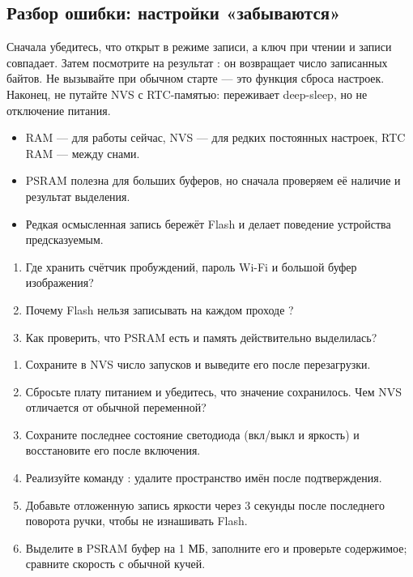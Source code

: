\subsection{Разбор ошибки: настройки «забываются»}

Сначала убедитесь, что  открыт в режиме записи, а ключ при чтении и
записи совпадает. Затем посмотрите на результат : он возвращает число записанных байтов.
Не вызывайте  при обычном старте --- это функция сброса настроек. Наконец, не путайте
NVS с RTC-памятью:  переживает deep-sleep, но не отключение питания.

\begin{summary}
\begin{itemize}[leftmargin=*]
  \item RAM --- для работы сейчас, NVS --- для редких постоянных настроек, RTC RAM --- между снами.
  \item PSRAM полезна для больших буферов, но сначала проверяем её наличие и результат выделения.
  \item Редкая осмысленная запись бережёт Flash и делает поведение устройства предсказуемым.
\end{itemize}
\end{summary}

\begin{selfcheck}
\begin{enumerate}
  \item Где хранить счётчик пробуждений, пароль Wi-Fi и большой буфер изображения?
  \item Почему Flash нельзя записывать на каждом проходе ?
  \item Как проверить, что PSRAM есть и память действительно выделилась?
\end{enumerate}
\end{selfcheck}

\begin{tasks}
\begin{enumerate}
\item {} Сохраните в NVS число запусков и выведите его после перезагрузки.
\item {} Сбросьте плату питанием и убедитесь, что значение сохранилось. Чем NVS отличается от обычной переменной?
\item {} Сохраните последнее состояние светодиода (вкл/выкл и яркость) и восстановите его после включения.
\item {} Реализуйте команду : удалите пространство имён  после подтверждения.
\item {} Добавьте отложенную запись яркости через 3 секунды после последнего поворота ручки, чтобы не изнашивать Flash.
\item {} Выделите в PSRAM буфер на 1 МБ, заполните его и проверьте содержимое; сравните скорость с обычной кучей.
\end{enumerate}
\end{tasks}
